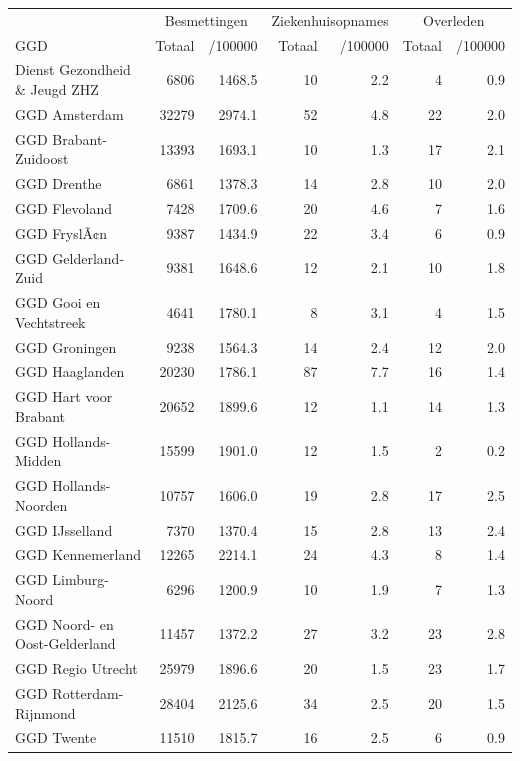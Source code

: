 \documentclass[
  english,
  man,floatsintext]{apa6}
\begin{document}
\begin{table}
\centering\begingroup\fontsize{10}{12}\selectfont

\begin{threeparttable}
\begin{tabular}{lrrrrrr}
\toprule
\multicolumn{1}{c}{ } & \multicolumn{2}{c}{Besmettingen} & \multicolumn{2}{c}{Ziekenhuisopnames} & \multicolumn{2}{c}{Overleden} \\
\cmidrule(l{3pt}r{3pt}){2-3} \cmidrule(l{3pt}r{3pt}){4-5} \cmidrule(l{3pt}r{3pt}){6-7}
GGD & Totaal & /100000 & Totaal & /100000 & Totaal & /100000\\
\midrule
Dienst Gezondheid \& Jeugd ZHZ & 6806 & 1468.5 & 10 & 2.2 & 4 & 0.9\\
GGD Amsterdam & 32279 & 2974.1 & 52 & 4.8 & 22 & 2.0\\
GGD Brabant-Zuidoost & 13393 & 1693.1 & 10 & 1.3 & 17 & 2.1\\
GGD Drenthe & 6861 & 1378.3 & 14 & 2.8 & 10 & 2.0\\
GGD Flevoland & 7428 & 1709.6 & 20 & 4.6 & 7 & 1.6\\
GGD FryslÃ¢n & 9387 & 1434.9 & 22 & 3.4 & 6 & 0.9\\
GGD Gelderland-Zuid & 9381 & 1648.6 & 12 & 2.1 & 10 & 1.8\\
GGD Gooi en Vechtstreek & 4641 & 1780.1 & 8 & 3.1 & 4 & 1.5\\
GGD Groningen & 9238 & 1564.3 & 14 & 2.4 & 12 & 2.0\\
GGD Haaglanden & 20230 & 1786.1 & 87 & 7.7 & 16 & 1.4\\
GGD Hart voor Brabant & 20652 & 1899.6 & 12 & 1.1 & 14 & 1.3\\
GGD Hollands-Midden & 15599 & 1901.0 & 12 & 1.5 & 2 & 0.2\\
GGD Hollands-Noorden & 10757 & 1606.0 & 19 & 2.8 & 17 & 2.5\\
GGD IJsselland & 7370 & 1370.4 & 15 & 2.8 & 13 & 2.4\\
GGD Kennemerland & 12265 & 2214.1 & 24 & 4.3 & 8 & 1.4\\
GGD Limburg-Noord & 6296 & 1200.9 & 10 & 1.9 & 7 & 1.3\\
GGD Noord- en Oost-Gelderland & 11457 & 1372.2 & 27 & 3.2 & 23 & 2.8\\
GGD Regio Utrecht & 25979 & 1896.6 & 20 & 1.5 & 23 & 1.7\\
GGD Rotterdam-Rijnmond & 28404 & 2125.6 & 34 & 2.5 & 20 & 1.5\\
GGD Twente & 11510 & 1815.7 & 16 & 2.5 & 6 & 0.9\\

\end{tabular}
\end{threeparttable}
\end{table}
\end{document}
